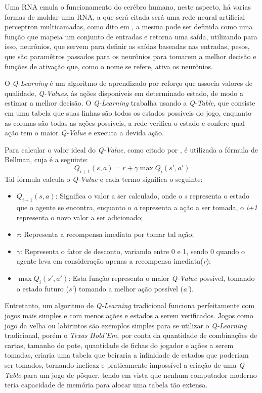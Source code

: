 Uma \gls{RNA} emula o funcionamento do cerébro humano, neste aspecto, há varias formas de moldar uma \gls{RNA}, a que será citada será uma rede neural artificial perceptron multicamadas, como dito em , a mesma pode ser definida como uma função que mapeia um conjunto de entradas e retorna uma saída, utilizando para isso, neurônios, que servem para definir as saídas baseadas nas entradas, pesos, que são paramêtros passados para os neurônios para tomarem a melhor decisão e funções de ativação que, como o nome se refere, ativa os neurônios.

O \textit{Q-Learning} é um algoritmo de aprendizado por reforço que associa valores de qualidade, \textit{Q-Values}, às ações disponiveis em determinado estado, de modo a estimar a melhor decisão. O \textit{Q-Learning} trabalha usando a \textit{Q-Table}, que consiste em uma tabela que suas linhas são todos os estados possíveis do jogo, enquanto as colunas são todas as ações possíveis, a rede verifica o estado e confere qual ação tem o maior \textit{Q-Value} e executa a devida ação.

Para calcular o valor ideal do \textit{Q-Value}, como citado por , é utilizada a fórmula de Bellman, cuja é a seguinte:
$$Q_{i+1}(s, a) = r + \gamma \max Q_i(s', a')$$
Tal fórmula calcula o \textit{Q-Value} e cada termo significa o seguinte:
\begin{itemize}
      \item $Q_{i+1}(s, a)$: Significa o valor a ser calculado, onde o \textit{s} representa o estado que o agente se encontra, enquanto o \textit{a} representa a ação a ser tomada, o \textit{i+1} representa o novo valor a ser adicionado;
      \item \textit{r}: Representa a recompensa imediata por tomar tal ação;
      \item $\gamma$: Representa o fator de desconto, variando entre 0 e 1, sendo 0 quando o agente leva em consideração apenas a recompensa imediata(\textit{r});
      \item $\max Q_i(s', a')$: Esta função representa o maior \textit{Q-Value} possível, tomando o estado futuro (\textit{s'}) tomando a melhor ação possível (\textit{a'}).
\end{itemize}

Entretanto, um algoritmo de \textit{Q-Learning} tradicional funciona perfeitamente com jogos mais simples e com menos ações e estados a serem verificados. Jogos como jogo da velha ou labirintos são exemplos simples para se utilizar o \textit{Q-Learning} tradicional, porém o \textit{Texas Hold'Em}, por conta da quantidade de combinações de cartas, tamanho do pote, quantidade de fichas do jogador e ações a serem tomadas, criaria uma tabela que beiraria a infinidade de estados que poderiam ser tomados, tornando ineficaz e praticamente impossível a criação de uma \textit{Q-Table} para um jogo de pôquer, tendo em vista que nenhum computador moderno teria capacidade de memória para alocar uma tabela tão extensa.


